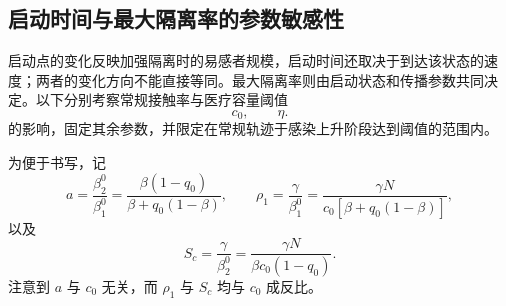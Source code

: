 \documentclass[lang=cn,a4paper,newtx]{elegantpaper}
\numberwithin{equation}{section}
\theoremstyle{plain}
\begin{document}
\subsection{启动时间与最大隔离率的参数敏感性}
启动点的变化反映加强隔离时的易感者规模，启动时间还取决于到达该状态的速度；两者的变化方向不能直接等同。最大隔离率则由启动状态和传播参数共同决定。以下分别考察常规接触率与医疗容量阈值
\[
c_0,\qquad \eta .
\]
的影响，固定其余参数，并限定在常规轨迹于感染上升阶段达到阈值的范围内。

为便于书写，记
\begin{equation}
a=\frac{\beta_2^0}{\beta_1^0}
=
\frac{\beta(1-q_0)}{\beta+q_0(1-\beta)},
\qquad
\rho_1=\frac{\gamma}{\beta_1^0}
=
\frac{\gamma N}{c_0[\beta+q_0(1-\beta)]},
\end{equation}
以及
\begin{equation}
S_c=\frac{\gamma}{\beta_2^0}
=
\frac{\gamma N}{\beta c_0(1-q_0)}.
\end{equation}
注意到 $a$ 与 $c_0$ 无关，而 $\rho_1$ 与 $S_c$ 均与 $c_0$ 成反比。
\end{document}
